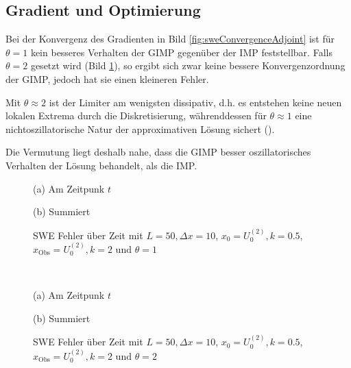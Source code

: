 \subsection{Gradient und Optimierung}
Bei der Konvergenz des Gradienten in Bild \ref{fig:sweConvergenceAdjoint} ist für $\theta=1$ kein besseres Verhalten der GIMP gegenüber der IMP feststellbar. Falls $\theta=2$ gesetzt wird (Bild \ref{fig:sweConvergenceAdjoint1}), so ergibt sich zwar keine bessere Konvergenzordnung der GIMP, jedoch hat sie einen kleineren Fehler.

Mit $\theta\approx 2$ ist der Limiter am wenigsten dissipativ, d.h. es entstehen keine neuen lokalen Extrema durch die Diskretisierung, währenddessen für $\theta\approx 1$ eine nichtoszillatorische Natur der approximativen Lösung sichert (\cite[Abschnitt 6]{kurganov2000new}).

Die Vermutung liegt deshalb nahe, dass die GIMP besser oszillatorisches Verhalten der Lösung behandelt, als die IMP.


\begin{figure}
\footnotesize
\begin{minipage}[b]{0.49\linewidth}
\centering

\caption*{(a) Am Zeitpunk $t$}
\end{minipage}
\begin{minipage}[b]{0.49\linewidth}
\centering

\caption*{(b) Summiert}
\end{minipage}
\caption{SWE Fehler über Zeit mit $L=50,\Delta x=10$, $x_0=U_0^{(2)},k=0.5$, $x_{\text{Obs}} = U_0^{(2)}, k=2$ und $\theta=1$}
\label{fig:sweConvergenceAdjoint}
% 
\quad\\[0.3cm]
\begin{minipage}[b]{0.49\linewidth}
\centering

\caption*{(a) Am Zeitpunk $t$}
\end{minipage}
\begin{minipage}[b]{0.49\linewidth}
\centering

\caption*{(b) Summiert}
\end{minipage}
\caption{SWE Fehler über Zeit mit $L=50,\Delta x=10$, $x_0=U_0^{(2)},k=0.5$, $x_{\text{Obs}} = U_0^{(2)}, k=2$ und $\theta=2$}
\label{fig:sweConvergenceAdjoint1}
\end{figure}


